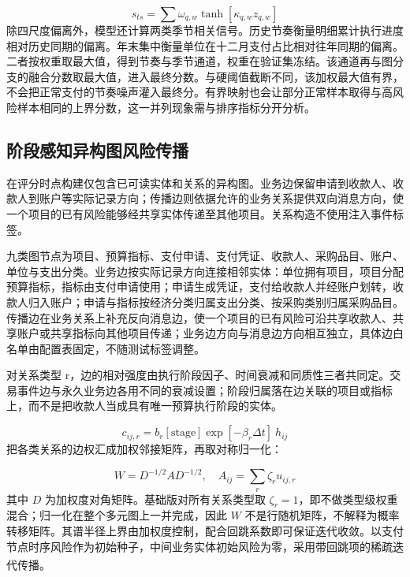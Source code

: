 \documentclass[a4paper,fleqn]{cas-dc}
\newcommand{\upcite}[1]{\textsuperscript{\cite{#1}}}
\begin{document}
\begin{equation}
s_{ts} = \sum \omega_{q,w} \tanh[\kappa_{q,w} z_{q,w}]
\end{equation}
除四尺度偏离外，模型还计算两类季节相关信号。历史节奏衡量明细累计执行进度相对历史同期的偏离。年末集中衡量单位在十二月支付占比相对往年同期的偏离。二者按权重取最大值，得到节奏与季节通道，权重在验证集冻结。该通道再与图分支的融合分数取最大值，进入最终分数。与硬阈值截断不同，该加权最大值有界，不会把正常支付的节奏噪声灌入最终分。有界映射也会让部分正常样本取得与高风险样本相同的上界分数，这一并列现象需与排序指标分开分析。

\subsection{阶段感知异构图风险传播}
在评分时点构建仅包含已可读实体和关系的异构图。业务边保留申请到收款人、收款人到账户等实际记录方向；传播边则依据允许的业务关系提供双向消息方向，使一个项目的已有风险能够经共享实体传递至其他项目。关系构造不使用注入事件标签。

九类图节点为项目、预算指标、支付申请、支付凭证、收款人、采购品目、账户、单位与支出分类。业务边按实际记录方向连接相邻实体：单位拥有项目，项目分配预算指标，指标由支付申请使用；申请生成凭证，支付给收款人并经账户划转，收款人归入账户；申请与指标按经济分类归属支出分类、按采购类别归属采购品目。传播边在业务关系上补充反向消息边，使一个项目的已有风险可沿共享收款人、共享账户或共享指标向其他项目传递；业务边方向与消息边方向相互独立，具体边白名单由配置表固定，不随测试标签调整。

对关系类型 r，边的相对强度由执行阶段因子、时间衰减和同质性三者共同定。交易事件边与永久业务边各用不同的衰减设置；阶段归属落在边关联的项目或指标上，而不是把收款人当成具有唯一预算执行阶段的实体。

\begin{equation}
c_{ij,r} = b_{r}[\mathrm{stage}] \exp[-\beta_{r}\Delta t]\ h_{ij}
\end{equation}
把各类关系的边权汇成加权邻接矩阵，再取对称归一化：

\begin{equation}
W = D^{-1/2}AD^{-1/2}, \quad A_{ij} = \sum_{r}\zeta_{r}u_{ij,r}
\end{equation}
其中 $D$ 为加权度对角矩阵。基础版对所有关系类型取 $\zeta_r = 1$，即不做类型级权重混合；归一化在整个多元图上一并完成，因此 $W$ 不是行随机矩阵，不解释为概率转移矩阵。其谱半径上界由加权度控制，配合回跳系数即可保证迭代收敛。以支付节点时序风险作为初始种子，中间业务实体初始风险为零，采用带回跳项的稀疏迭代传播\upcite{ref29}。
\end{document}
